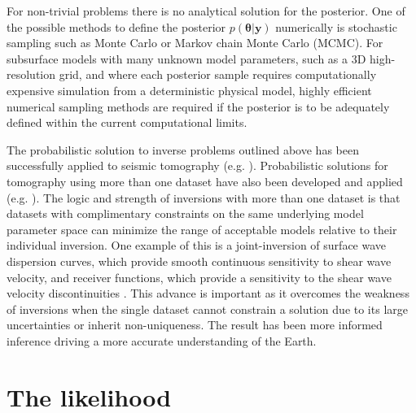 For non-trivial problems there is no analytical solution for the posterior. One of the possible methods to define the posterior $p(\bm{\theta}|\bm{y})$ numerically is stochastic sampling such as Monte Carlo or Markov chain Monte Carlo (MCMC). For subsurface models with many unknown model parameters, such as a 3D high-resolution grid, and where each posterior sample requires computationally expensive simulation from a deterministic physical model, highly efficient numerical sampling methods are required if the posterior is to be adequately defined within the current computational limits. \par

The probabilistic solution to inverse problems outlined above has been successfully applied to seismic tomography (e.g. \citet{Zhao1996,Sambridge1999,Shapiro2002,Trampert2004,Khan2011}). Probabilistic solutions for tomography using more than one dataset have also been developed  and applied (e.g. \citet{khan2007joint,Moorkamp2010,Bodin2012,Shen2012,afonso2013a,afonso2013b,afonso2016}). The logic and strength of inversions with more than one dataset is that datasets with complimentary constraints on the same underlying model parameter space can minimize the range of acceptable models relative to their individual inversion. One example of this is a joint-inversion of surface wave dispersion curves, which  provide smooth continuous sensitivity to shear wave velocity, and receiver functions, which provide a sensitivity to the shear wave velocity discontinuities \citep{Bodin2012}. This advance is important as it overcomes the weakness of inversions when the single dataset cannot constrain a solution due to its large uncertainties or inherit non-uniqueness. The result has been more informed inference driving a more accurate understanding of the Earth.

\section{The likelihood}


